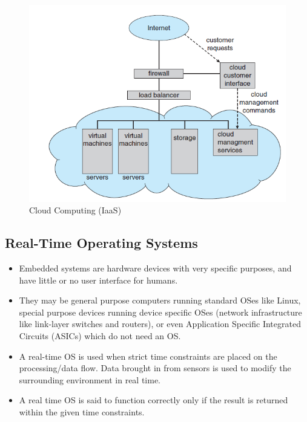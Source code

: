 \documentclass{article}
\theoremstyle{plain}
\theoremstyle{definition}
\begin{document}
\begin{itemize}
    \begin{figure}[h]
        \centering
        \includegraphics[scale=0.8]{os10.png}
        \caption{Cloud Computing (IaaS)}
        \label{fig:my_label_10}
    \end{figure}
\end{itemize}

\subsection{Real-Time Operating Systems}

\begin{itemize}
    \item Embedded systems are hardware devices with very specific purposes, and have little or no user interface for humans.
    
    \item They may be general purpose computers running standard OSes like Linux, special purpose devices running device specific OSes (network infrastructure like link-layer switches and routers), or even Application Specific Integrated Circuits (ASICs) which do not need an OS.
    
    \item A real-time OS is used when strict time constraints are placed on the processing/data flow. Data brought in from sensors is used to modify the surrounding environment in real time. 
    
    \item A real time OS is said to function correctly only if the result is returned within the given time constraints. 
\end{itemize}
\end{document}
